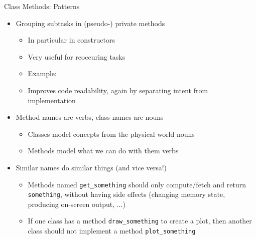 \begin{frame}{Class Methods: Patterns}
%
\begin{itemize}
\item Grouping subtasks in (pseudo-) private methods
	\begin{itemize}
	\item In particular in constructors
	\item Very useful for reoccuring tasks
	\item Example: 
	\item Improves code readability, again by separating intent from implementation
	\end{itemize}
\item Method names are verbs, class names are nouns
	\begin{itemize}
	\item Classes model concepts from the physical world \Thus nouns
	\item Methods model what we can do with them \Thus verbs
	\end{itemize}
\item Similar names do similar things (and vice versa!)
	\begin{itemize}
	\item Methods named \texttt{get\_something} should only compute/fetch and return \texttt{something}, without having side effects (changing memory state, producing on-screen output, ...)
	\item If one class has a method \texttt{draw\_something} to create a plot, then another class should not implement a method \texttt{plot\_something}
	\end{itemize}
\end{itemize}
%
\end{frame}


